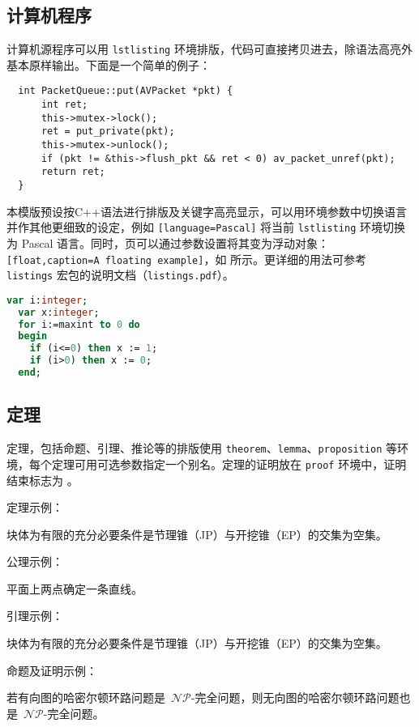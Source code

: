 \subsection{计算机程序}
计算机源程序可以用 \texttt{lstlisting} 环境排版，代码可直接拷贝进去，除语法高亮外基本原样输出。下面是一个简单的例子：
\begin{lstlisting}
  int PacketQueue::put(AVPacket *pkt) {
      int ret;    
      this->mutex->lock();
      ret = put_private(pkt);
      this->mutex->unlock();    
      if (pkt != &this->flush_pkt && ret < 0) av_packet_unref(pkt);    
      return ret;
  }
\end{lstlisting}

本模版预设按C++语法进行排版及关键字高亮显示，可以用环境参数中切换语言并作其他更细致的设定，例如 \texttt{[language=Pascal]} 将当前 \texttt{lstlisting} 环境切换为 Pascal 语言。同时，页可以通过参数设置将其变为浮动对象：\texttt{[float,caption=A floating example]}，如  所示。更详细的用法可参考 \texttt{listings} 宏包的说明文档（\texttt{listings.pdf}）。
\begin{lstlisting}[float, language=Pascal, caption={浮动代码块}, label={lst:samples:pas}]
  var i:integer;
  var x:integer;
  for i:=maxint to 0 do
  begin
    if (i<=0) then x := 1;
    if (i>0) then x := 0;
  end;
\end{lstlisting}

\subsection{定理}
定理，包括命题、引理、推论等的排版使用 \texttt{theorem}、\texttt{lemma}、\texttt{proposition} 等环境，每个定理可用可选参数指定一个别名。定理的证明放在 \texttt{proof} 环境中，证明结束标志为 。

定理示例：
\begin{theorem}[有限性定理] \label{thm:samples:t}
块体为有限的充分必要条件是节理锥（JP）与开挖锥（EP）的交集为空集。
\end{theorem}

公理示例：
\begin{axiom} \label{thm:samples:a}
平面上两点确定一条直线。
\end{axiom}

引理示例：
\begin{lemma} \label{thm:samples:l}
块体为有限的充分必要条件是节理锥（JP）与开挖锥（EP）的交集为空集。
\end{lemma}

命题及证明示例：
\newcommand{\sNP}{\ensuremath{\mathcal{NP}}}
\newcommand{\tNP}{\sNP\ }
\newcommand{\tNPC}{\mbox{\ensuremath{\mathcal{NP}\text{-完全}}}}
\begin{proposition} \label{thm:samples:p}
若有向图的哈密尔顿环路问题是~\tNPC 问题，则无向图的哈密尔顿环路问题也是~\tNPC 问题。
\end{proposition}

